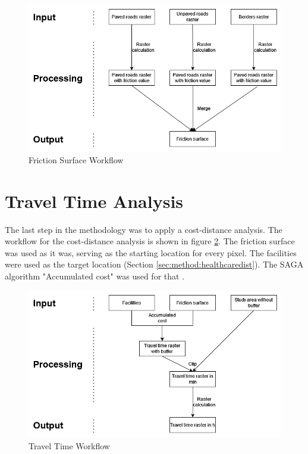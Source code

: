\documentclass[11pt, a4paper]{report}
\begin{document}
\begin{figure}[H]
  \centering
  \includegraphics[width=0.9\linewidth]{figures/frictionsurfaceworkflow.png}
  \caption{Friction Surface Workflow}
  \label{fig:frictionsurfaceworkflow}
\end{figure}

\section{Travel Time Analysis}\label{sec:method:traveltime}
The last step in the methodology was to apply a cost-distance analysis. The workflow for the cost-distance analysis is shown in figure \ref{fig:traveltimeworkflow}. The friction surface was used as it was, serving as the starting location for every pixel. The facilities were used as the target location (Section \ref{sec:method:healthcaredist}). The SAGA algorithm "Accumulated cost" was used for that \citep{conrad_system_2015}.

\begin{figure}[H]
  \centering
  \includegraphics[width=0.9\linewidth]{figures/traveltimeworkflow.png}
  \caption{Travel Time Workflow}
  \label{fig:traveltimeworkflow}
\end{figure}
\end{document}
